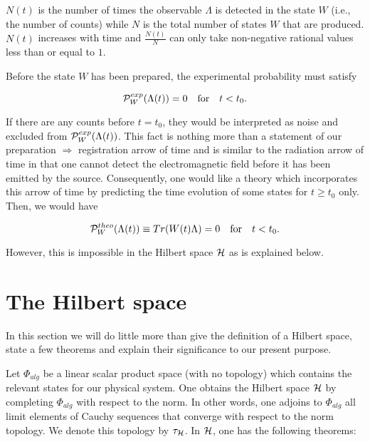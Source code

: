 \documentclass[12pt]{article}
\begin{document}
\noindent $N(t)$ is the number of times the observable $\Lambda$ is detected in the state $W$ (i.e., the number of counts) while $N$ is the total number of states $W$ that are produced.  $N(t)$ increases with time and $\frac{N(t)}{N}$ can only take non-negative rational values less than or equal to $1$.

Before the state $W$ has been prepared, the experimental probability must satisfy

\begin{equation}
{\cal P}_W^{exp}(\Lambda(t)) = 0 \,\,\,\,\,\, \mbox{for} \,\,\,\,\,\, t < t_0.     \label{eq: experimentalfact}
\end{equation}

\noindent If there are any counts before $t=t_0$, they would be interpreted as noise and excluded from ${\cal P}_W^{exp}(\Lambda(t))$.  This fact is nothing more than a statement of our preparation $\Rightarrow$ registration arrow of time and is similar to the radiation arrow of time in that one cannot detect the electromagnetic field before it has been emitted by the source.  Consequently, one would like a theory which incorporates this arrow of time by predicting the time evolution of some states for $t \geq t_0$ only.  Then, we would have

\begin{equation}
{\cal P}^{theo}_W(\Lambda(t)) \equiv Tr(W(t)\Lambda) = 0 \,\,\,\,\,\, \mbox{for} \,\,\,\,\,\, t < t_0.  \label{eq: desiredproperty}
\end{equation}

\noindent However, this is impossible in the Hilbert space ${\cal H}$ as is explained below.

\section{The Hilbert space}

In this section we will do little more than give the definition of a Hilbert space, state a few theorems and explain their significance to our present purpose.

Let $\Phi_{alg}$ be a linear scalar product space (with no topology) which contains the relevant states for our physical system.  One obtains the Hilbert space ${\cal H}$ by completing $\Phi_{alg}$ with respect to the norm.  In other words, one adjoins to $\Phi_{alg}$ all limit elements of Cauchy sequences that converge with respect to the norm topology.  We denote this topology by $\tau_{\cal H}$.  In ${\cal H}$, one has the following theorems:
\end{document}
